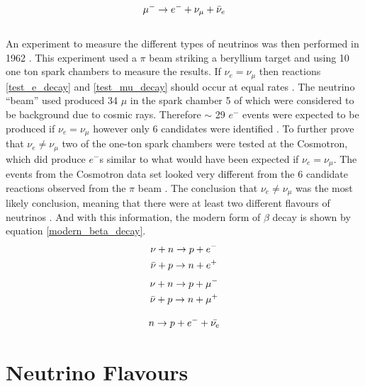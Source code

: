 \begin{equation}
    \mu^- \rightarrow e^- + \nu_\mu + \Bar{\nu}_e
    \label{proper_mu_decay}
\end{equation}
\\An experiment to measure the different types of neutrinos was then performed in 1962 \cite{DanbyG1962PhysRevLett.9.36}. This experiment used a $\pi$ beam striking a beryllium target and using 10 one ton spark chambers to measure the results. If $\nu_e = \nu_\mu$ then reactions \ref{test_e_decay} and \ref{test_mu_decay} should occur at equal rates \cite{DanbyG1962PhysRevLett.9.36}. The neutrino ``beam'' used produced 34 $\mu$ in the spark chamber 5 of which were considered to be background due to cosmic rays. Therefore $\sim$ 29 $e^-$ events were expected to be produced if $\nu_e = \nu_\mu$ however only 6 candidates were identified \cite{DanbyG1962PhysRevLett.9.36}. To further prove that $\nu_e \not= \nu_\mu$ two of the one-ton spark chambers were tested at the Cosmotron, which did produce $e^-$s similar to what would have been expected if $\nu_e = \nu_\mu$. The events from the Cosmotron data set looked very different from the 6 candidate reactions observed from the $\pi$ beam \cite{DanbyG1962PhysRevLett.9.36}. The conclusion that $\nu_e \not= \nu_\mu$ was the most likely conclusion, meaning that there were at least two different flavours of neutrinos \cite{DanbyG1962PhysRevLett.9.36}. And with this information, the modern form of $\beta$ decay is shown by equation \ref{modern_beta_decay}.
\begin{equation}
    \begin{split}
    \nu + n \rightarrow p + e^- \\
    \Bar{\nu} + p \rightarrow n + e^+
    \label{test_e_decay}
    \end{split}
\end{equation}
\begin{equation}
    \begin{split}
    \nu + n \rightarrow p + \mu^-  \\
    \Bar{\nu} + p \rightarrow n + \mu^+
    \label{test_mu_decay}
    \end{split}
\end{equation}

\begin{equation}
    n \rightarrow p + e^- + \Bar{\nu_e} 
    \label{modern_beta_decay}
\end{equation}

\section{Neutrino Flavours}
